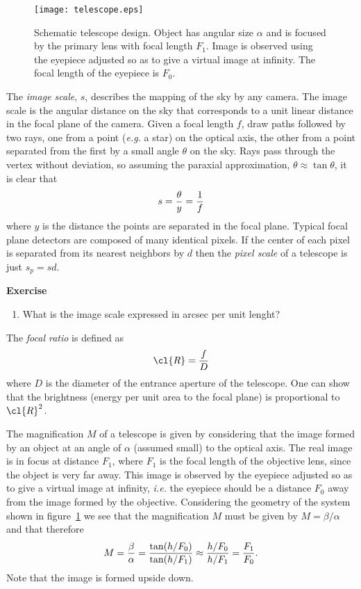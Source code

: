 \begin{figure}[th]
	\centering
	\texttt{[image: telescope.eps]}
  \caption{Schematic telescope design. Object has angular size $\alpha$ and is focused by 
the primary lens with focal length $F_1$. Image is observed using the eyepiece adjusted so
as to give a virtual image at infinity. The focal length of the eyepiece is $F_0$. }
  \label{fig:telescope}
\end{figure}

The {\it image scale}, $s$, describes the mapping of the sky by any camera. The image scale
is the angular distance on the sky that corresponds to a unit linear distance in the focal 
plane of the camera. Given a focal length $f$, draw paths followed by two rays, one from 
a point ({\it e.g.} a star) on the optical axis, the other from a point separated from the 
first by a small angle $\theta$ on the sky. Rays pass through the vertex without 
deviation, so assuming the paraxial approximation, $\theta\approx\tan\theta$, it is clear that
\[
s={\theta\over y}={1\over f}
\]
where $y$ is the distance the points are separated in the focal plane. Typical focal plane 
detectors are composed of many identical pixels. If the center of each pixel is separated 
from its nearest neighbors by $d$ then the {\it pixel scale} of a telescope is just $s_p=sd$.

{\bf Exercise}

\begin{enumerate}
\setcounter{enumi}{\value{count}}
\item What is the image scale expressed in arcsec per unit lenght?
\setcounter{count}{\value{enumi}} 
\end{enumerate}

The {\it focal ratio} is defined as 
\[
\cl{R}={f\over D}
\]
where $D$ is the diameter of the entrance aperture of the telescope. One can show that the 
brightness (energy per unit area to the focal plane) is proportional to $\cl{R}^2$.

The magnification $M$ of a telescope is given by considering that the image
formed by an object at an angle of $\alpha$ (assumed small) to the optical axis.
The real image is in focus at distance $F_1$, where $F_1$ is the focal length of the
objective lens, since the object is very far away. This image is observed by the eyepiece 
adjusted so as to give a virtual image at infinity, {\it i.e.} the eyepiece should be a distance
$F_0$ away from the image formed by the objective. Considering the geometry of the 
system shown in figure~\ref{fig:telescope} we see that the magnification $M$ must 
be given by $M={\beta/\alpha}$ and that therefore
\[ M={\beta\over\alpha}={\tan({h/F_0})\over\tan({h/F_1})}\approx{{h/F_0}\over{h/F_1}}={F_1\over F_0}.\]
Note that the image is formed upside down.

